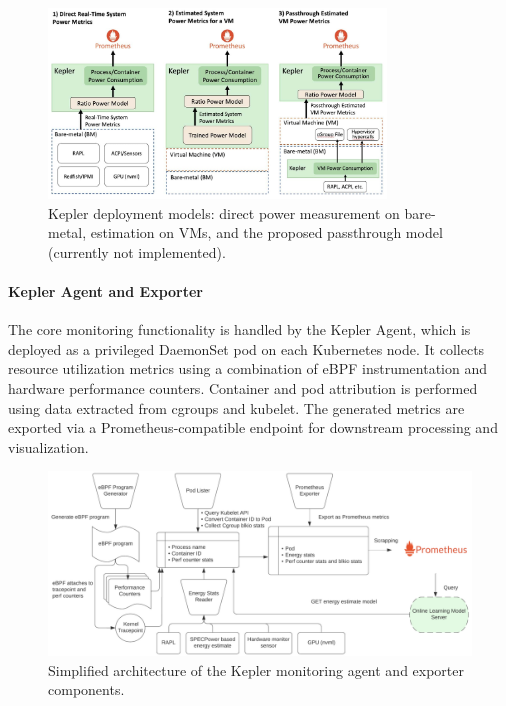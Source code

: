 \begin{figure}[ht]
  \centering
  \includegraphics[width=0.8\textwidth]{Figures/kepler_deployment_modes.jpg}
  \caption{Kepler deployment models: direct power measurement on bare-metal, estimation on VMs, and the proposed passthrough model (currently not implemented).}
  \label{fig:kepler-deployment-modes}
\end{figure}

\paragraph{Kepler Agent and Exporter}
The core monitoring functionality is handled by the Kepler Agent, which is deployed as a privileged DaemonSet pod on each Kubernetes node. It collects resource utilization metrics using a combination of eBPF instrumentation and hardware performance counters. Container and pod attribution is performed using data extracted from cgroups and kubelet. The generated metrics are exported via a Prometheus-compatible endpoint for downstream processing and visualization.

\begin{figure}[ht]
  \centering
  \includegraphics[width=1\textwidth]{Figures/kepler_architecture.png}
  \caption{Simplified architecture of the Kepler monitoring agent and exporter components.}
  \label{fig:kepler-architecture}
\end{figure}



